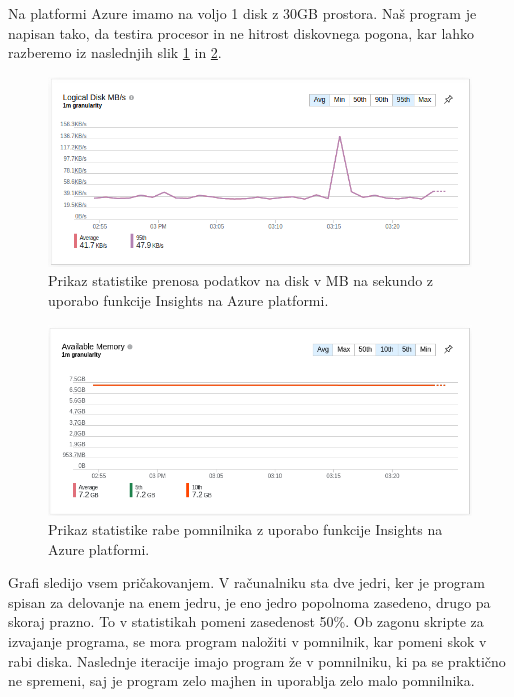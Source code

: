 Na platformi Azure imamo na voljo 1 disk z 30GB prostora. Naš program je napisan tako, da testira procesor in ne hitrost diskovnega pogona, kar lahko razberemo iz naslednjih slik \ref{3_kekw3} in \ref{3_kekw4}.


\begin{figure}[H]
	\centering
	\includegraphics[scale=0.46]{Img/3_insights_iombs.png}
	\caption{Prikaz statistike prenosa podatkov na disk v MB na sekundo z uporabo funkcije Insights na Azure platformi.}
	\label{3_kekw3}
\end{figure}

\begin{figure}[H]
	\centering
	\includegraphics[scale=0.46]{Img/3_insights_mem.png}
	\caption{Prikaz statistike rabe pomnilnika z uporabo funkcije Insights na Azure platformi.}
	\label{3_kekw4}
\end{figure}

Grafi sledijo vsem pričakovanjem. V računalniku sta dve jedri, ker je program spisan za delovanje na enem jedru, je eno jedro popolnoma zasedeno, drugo pa skoraj prazno. To v statistikah pomeni zasedenost 50\%. Ob zagonu skripte za izvajanje programa, se mora program naložiti v pomnilnik, kar pomeni skok v rabi diska. Naslednje iteracije imajo program že v pomnilniku, ki pa se praktično ne spremeni, saj je program zelo majhen in uporablja zelo malo pomnilnika.

